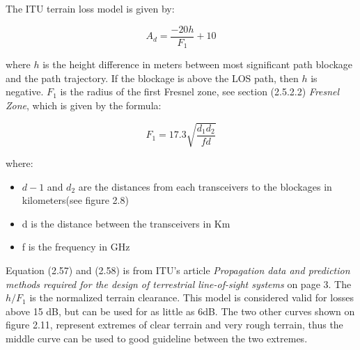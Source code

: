 The ITU terrain loss model is given by:

\begin{equation}
    A_d = \frac{-20h}{F_1}+10
\end{equation}

where $h$ is the height difference in meters between most significant path blockage and the path trajectory. If the blockage is above the LOS path, then $h$ is negative. $F_1$ is the radius of the first Fresnel zone, see section (2.5.2.2) \textit{Fresnel Zone}, which is given by the formula:

\begin{equation}
    F_1 = 17.3 \sqrt{\frac{d_1d_2}{fd}}
\end{equation}

where:

\begin{itemize}
  \item $d-1$ and $d_2$ are the distances from each transceivers to the blockages in kilometers(see figure 2.8)
  \item d is the distance between the transceivers in Km
  \item f is the frequency in GHz
\end{itemize}

Equation (2.57) and (2.58) is from ITU's article \textit{Propagation data and prediction methods required for the design of terrestrial line-of-sight systems}\cite{ITUTerrain} on page 3. The $h/F_1$ is the normalized terrain clearance. This model is considered valid for losses above 15 dB, but can be used for as little as 6dB. The two other curves shown on figure 2.11, represent extremes of clear terrain and very rough terrain, thus the middle curve can be used to good guideline between the two extremes.  

